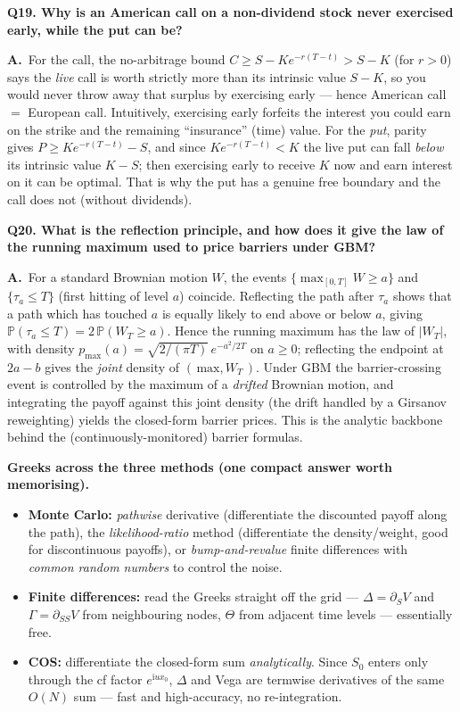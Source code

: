 \documentclass[11pt]{article}
\newcommand{\Prob}{\mathbb{P}}
\newcommand{\ii}{\mathrm{i}}
\newcommand{\Qq}[1]{\bigskip\noindent\textbf{\large #1}\par\nobreak\smallskip}
\newcommand{\A}{\noindent\textbf{A.}\ }
\begin{document}
\Qq{Q19. Why is an American call on a non-dividend stock never exercised early, while the put can be?}
\A For the call, the no-arbitrage bound $C\ge S-Ke^{-r(T-t)}>S-K$ (for $r>0$) says the \emph{live} call is worth
strictly more than its intrinsic value $S-K$, so you would never throw away that surplus by exercising early ---
hence American call $=$ European call. Intuitively, exercising early forfeits the interest you could earn on the
strike and the remaining ``insurance'' (time) value. For the \emph{put}, parity gives
$P\ge Ke^{-r(T-t)}-S$, and since $Ke^{-r(T-t)}<K$ the live put can fall \emph{below} its intrinsic value
$K-S$; then exercising early to receive $K$ now and earn interest on it can be optimal. That is why the put has
a genuine free boundary and the call does not (without dividends).

\Qq{Q20. What is the reflection principle, and how does it give the law of the running maximum used to price barriers under GBM?}
\A For a standard Brownian motion $W$, the events $\{\max_{[0,T]}W\ge a\}$ and $\{\tau_a\le T\}$ (first hitting
of level $a$) coincide. Reflecting the path after $\tau_a$ shows that a path which has touched $a$ is equally
likely to end above or below $a$, giving $\Prob(\tau_a\le T)=2\,\Prob(W_T\ge a)$. Hence the running maximum has
the law of $|W_T|$, with density $p_{\max}(a)=\sqrt{2/(\pi T)}\,e^{-a^2/2T}$ on $a\ge0$; reflecting the endpoint
at $2a-b$ gives the \emph{joint} density of $(\,\text{max},W_T\,)$. Under GBM the barrier-crossing event is
controlled by the maximum of a \emph{drifted} Brownian motion, and integrating the payoff against this joint
density (the drift handled by a Girsanov reweighting) yields the closed-form barrier prices. This is the
analytic backbone behind the (continuously-monitored) barrier formulas.

\begin{keybox}
\textbf{Greeks across the three methods (one compact answer worth memorising).}
\begin{itemize}
  \item \textbf{Monte Carlo:} \emph{pathwise} derivative (differentiate the discounted payoff along the path),
  the \emph{likelihood-ratio} method (differentiate the density/weight, good for discontinuous payoffs), or
  \emph{bump-and-revalue} finite differences with \emph{common random numbers} to control the noise.
  \item \textbf{Finite differences:} read the Greeks straight off the grid --- $\Delta=\partial_S V$ and
  $\Gamma=\partial_{SS}V$ from neighbouring nodes, $\Theta$ from adjacent time levels --- essentially free.
  \item \textbf{COS:} differentiate the closed-form sum \emph{analytically}. Since $S_0$ enters only through the
  cf factor $e^{\ii u x_0}$, $\Delta$ and Vega are termwise derivatives of the same $O(N)$ sum --- fast and
  high-accuracy, no re-integration.
\end{itemize}
\end{keybox}
\end{document}
